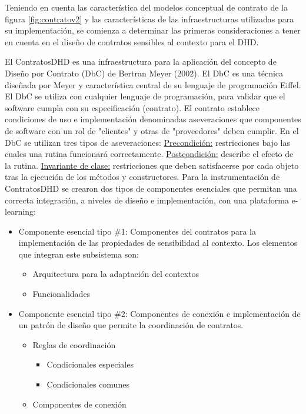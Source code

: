  


Teniendo en cuenta las característica del modelos conceptual de contrato de la figura \ref{fig:contratov2} y las características de las infraestructuras utilizadas para su implementación, se comienza a determinar las primeras consideraciones a tener en cuenta en el diseño de contratos sensibles al contexto para el DHD.


\begin{defi} [ContratoDHD]
El ContratosDHD es una infraestructura para la aplicación del concepto de Diseño por Contrato (DbC) de Bertran Meyer (2002). El DbC es una técnica diseñada por Meyer y característica central de su lenguaje de programación Eiffel\cite{Meyer}. El DbC se utiliza con cualquier lenguaje de programación, para validar que el software cumpla con su especificación (contrato). El contrato establece condiciones de uso e implementación denominadas aseveraciones que componentes de software con un rol de "clientes" y otras de "proveedores" deben cumplir. En el DbC se utilizan tres tipos de aseveraciones: \underline{Precondición:} restricciones bajo las cuales una rutina funcionará correctamente.  \underline{Postcondición:} describe el efecto de la rutina. \underline{Invariante de clase:} restricciones que deben satisfacerse por cada objeto tras la ejecución de los métodos y constructores. 
Para la instrumentación de ContratosDHD se crearon dos tipos de componentes esenciales que permitan una correcta integración, a niveles de diseño e implementación, con una plataforma e-learning:

\begin{itemize} \label{CEC}

 \item Componente esencial tipo \#1: Componentes del contratos para la implementación de las
propiedades de sensibilidad al contexto. Los elementos que integran este
subsistema son:
 
      \begin{itemize}
       \item Arquitectura para la adaptación del contextos
       \item Funcionalidades 
      \end{itemize}
      
  \item Componente esencial tipo \#2: Componentes de conexión e implementación de un patrón de
dise\~no que permite la coordinación de contratos.
	    \begin{itemize}
	    \item Reglas de coordinación
		  
		  \begin{itemize}
		   \item Condicionales especiales
		   \item Condicionales comunes 
		  \end{itemize}
	    \item Componentes de conexión
	    \end{itemize}
\end{itemize}
\end{defi} 



